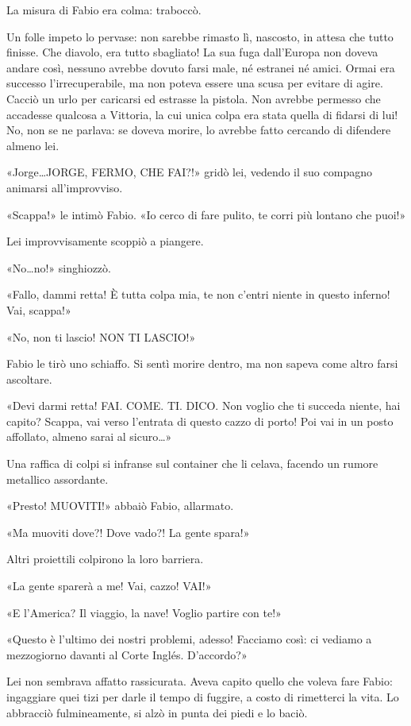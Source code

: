 La misura di Fabio era colma: traboccò. 

Un folle impeto lo pervase: non sarebbe rimasto lì, nascosto, in attesa che tutto finisse. Che diavolo, era tutto sbagliato! La sua fuga dall'Europa non doveva andare così, nessuno avrebbe dovuto farsi male, né estranei né amici. Ormai era successo l'irrecuperabile, ma non poteva essere una scusa per evitare di agire. Cacciò un urlo per caricarsi ed estrasse la pistola. Non avrebbe permesso che accadesse qualcosa a Vittoria, la cui unica colpa era stata quella di fidarsi di lui! No, non se ne parlava: se doveva morire, lo avrebbe fatto cercando di difendere almeno lei.

«Jorge\ldots JORGE, FERMO, CHE FAI?!» gridò lei, vedendo il suo compagno animarsi all'improvviso.

«Scappa!» le intimò Fabio. «Io cerco di fare pulito, te corri più lontano che puoi!»

Lei improvvisamente scoppiò a piangere.

«No\ldots no!» singhiozzò.

«Fallo, dammi retta! È tutta colpa mia, te non c'entri niente in questo inferno! Vai, scappa!»

«No, non ti lascio! NON TI LASCIO!»

Fabio le tirò uno schiaffo. Si sentì morire dentro, ma non sapeva come altro farsi ascoltare.

«Devi darmi retta! FAI. COME. TI. DICO. Non voglio che ti succeda niente, hai capito? Scappa, vai verso l'entrata di questo cazzo di porto! Poi vai in un posto affollato, almeno sarai al sicuro\ldots»

Una raffica di colpi si infranse sul container che li celava, facendo un rumore metallico assordante.

«Presto! MUOVITI!» abbaiò Fabio, allarmato.

«Ma muoviti dove?! Dove vado?! La gente spara!»

Altri proiettili colpirono la loro barriera.

«La gente sparerà a me! Vai, cazzo! VAI!»

«E l'America? Il viaggio, la nave! Voglio partire con te!»

«Questo è l'ultimo dei nostri problemi, adesso! Facciamo così: ci vediamo a mezzogiorno davanti al Corte Inglés. D'accordo?»

Lei non sembrava affatto rassicurata. Aveva capito quello che voleva fare Fabio: ingaggiare quei tizi per darle il tempo di fuggire, a costo di rimetterci la vita. Lo abbracciò fulmineamente, si alzò in punta dei piedi e lo baciò.

